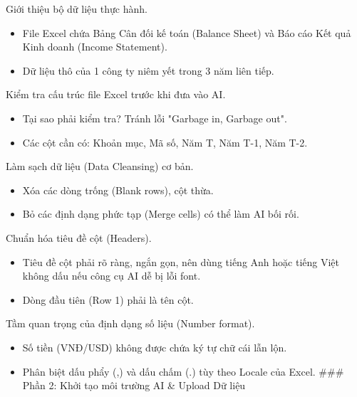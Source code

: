 \documentclass[aspectratio=169]{beamer}
\begin{document}
\begin{frame}{Giới thiệu bộ dữ liệu thực hành.}
    \begin{itemize}
        \item File Excel chứa Bảng Cân đối kế toán (Balance Sheet) và Báo cáo Kết quả Kinh doanh (Income Statement).
        \item Dữ liệu thô của 1 công ty niêm yết trong 3 năm liên tiếp.
    \end{itemize}
\end{frame}


\begin{frame}{Kiểm tra cấu trúc file Excel trước khi đưa vào AI.}
    \begin{itemize}
        \item Tại sao phải kiểm tra? Tránh lỗi "Garbage in, Garbage out".
        \item Các cột cần có: Khoản mục, Mã số, Năm T, Năm T-1, Năm T-2.
    \end{itemize}
\end{frame}


\begin{frame}{Làm sạch dữ liệu (Data Cleansing) cơ bản.}
    \begin{itemize}
        \item Xóa các dòng trống (Blank rows), cột thừa.
        \item Bỏ các định dạng phức tạp (Merge cells) có thể làm AI bối rối.
    \end{itemize}
\end{frame}


\begin{frame}{Chuẩn hóa tiêu đề cột (Headers).}
    \begin{itemize}
        \item Tiêu đề cột phải rõ ràng, ngắn gọn, nên dùng tiếng Anh hoặc tiếng Việt không dấu nếu công cụ AI dễ bị lỗi font.
        \item Dòng đầu tiên (Row 1) phải là tên cột.
    \end{itemize}
\end{frame}


\begin{frame}{Tầm quan trọng của định dạng số liệu (Number format).}
    \begin{itemize}
        \item Số tiền (VNĐ/USD) không được chứa ký tự chữ cái lẫn lộn.
        \item Phân biệt dấu phẩy (,) và dấu chấm (.) tùy theo Locale của Excel.
        ### Phần 2: Khởi tạo môi trường AI \& Upload Dữ liệu
    \end{itemize}
\end{frame}
\end{document}
